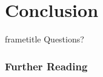 \documentclass[
]{beamer}
\begin{document}
\section{Conclusion}

\begin{frame}
  \begin{beamercolorbox}{frametitle}
    \centering \Huge Questions?
  \end{beamercolorbox}
\end{frame}

\begin{frame}
  \frametitle{Further Reading}
  \begin{thebibliography}{}
  \bibitem{}
  \bibitem{}
  \end{thebibliography}
\end{frame}
\end{document}
